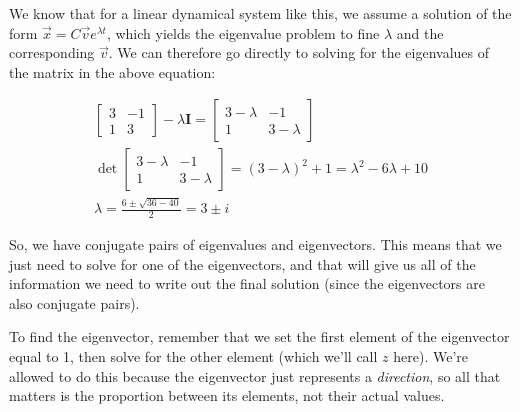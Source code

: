 \documentclass[letterpaper, fontsize=12pt]{scrartcl} %
\numberwithin{equation}{section} %
\numberwithin{figure}{section} %
\numberwithin{table}{section} %
\begin{document}
\begin{enumerate}
\begin{enumerate}[label = (\alph*)]
We know that for a linear dynamical system like this, we assume a solution of the form $\vec{x} = C \vec{v} e^{\lambda t}$, which yields the eigenvalue problem to fine $\lambda$ and the corresponding $\vec{v}$. We can therefore go directly to solving for the eigenvalues of the matrix in the above equation:

\begin{gather*}
\begin{bmatrix} 3 & -1 \\ 1 & 3 \end{bmatrix} - \lambda \mathbf{I} = \begin{bmatrix} 3 - \lambda & -1 \\ 1 & 3 - \lambda \end{bmatrix} \\
\det \begin{bmatrix} 3 - \lambda & -1 \\ 1 & 3 - \lambda \end{bmatrix} = (3 - \lambda)^2 + 1 = \lambda^2 - 6\lambda + 10 \\
\lambda = \frac{6 \pm \sqrt{ 36 - 40}}{2} = 3 \pm i 
\end{gather*}

So, we have conjugate pairs of eigenvalues and eigenvectors. This means that we just need to solve for one of the eigenvectors, and that will give us all of the information we need to write out the final solution (since the eigenvectors are also conjugate pairs). 

\par To find the eigenvector, remember that we set the first element of the eigenvector equal to 1, then solve for the other element (which we'll call $z$ here). We're allowed to do this because the eigenvector just represents a \textit{direction}, so all that matters is the proportion between its elements, not their actual values.


\end{enumerate}
\end{enumerate}
\end{document}

